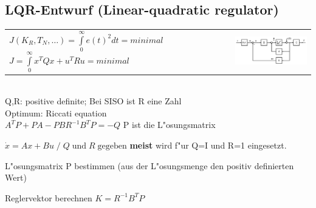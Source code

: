 \subsection{LQR-Entwurf (Linear-quadratic regulator)}
	\begin{tabular}{ll}
		\parbox{6cm}{	$J(K_R,T_N,\ldots)=\int\limits^{\infty}_0 e(t)^2 dt = minimal$\\
						$J=\int\limits_0^{\infty} {x^T Q x+u^T R u}= minimal$\\}&
		\parbox{6cm}{\includegraphics[width=6cm]{./bilder/statereg.png}}
	\end{tabular}\\	
	Q,R: positive definite; Bei SISO ist R eine Zahl\\
	Optimum: Riccati equation\\
	$ A^T P + P A - P B R^{-1} B^T P = -Q$ \hspace{2cm}
	P ist die L"osungsmatrix
	\begin{aufzaehlung}
    	\item $\dot{x} = Ax + Bu \; / \;  Q \; \text{und} \; R \; \text{gegeben}$
    	\textbf{meist} wird f"ur Q=I und R=1 eingesetzt.
    	\item L"osungsmatrix P bestimmen (aus der L"osungsmenge den positiv
    	definierten Wert)
    	\item Reglervektor berechnen $K=R^{-1} B^T P$
    \end{aufzaehlung}

